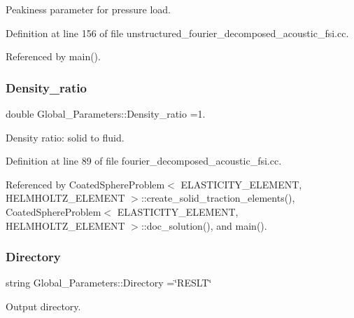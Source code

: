 Peakiness parameter for pressure load. 



Definition at line 156 of file unstructured\+\_\+fourier\+\_\+decomposed\+\_\+acoustic\+\_\+fsi.\+cc.



Referenced by main().

\mbox{\label{namespaceGlobal__Parameters_a517d4c31b8bce6563c2f605266dd9679}} 
\subsubsection{\texorpdfstring{Density\+\_\+ratio}{Density\_ratio}}
{\footnotesize\ttfamily double Global\+\_\+\+Parameters\+::\+Density\+\_\+ratio =1.}



Density ratio\+: solid to fluid. 



Definition at line 89 of file fourier\+\_\+decomposed\+\_\+acoustic\+\_\+fsi.\+cc.



Referenced by Coated\+Sphere\+Problem$<$ E\+L\+A\+S\+T\+I\+C\+I\+T\+Y\+\_\+\+E\+L\+E\+M\+E\+N\+T, H\+E\+L\+M\+H\+O\+L\+T\+Z\+\_\+\+E\+L\+E\+M\+E\+N\+T $>$\+::create\+\_\+solid\+\_\+traction\+\_\+elements(), Coated\+Sphere\+Problem$<$ E\+L\+A\+S\+T\+I\+C\+I\+T\+Y\+\_\+\+E\+L\+E\+M\+E\+N\+T, H\+E\+L\+M\+H\+O\+L\+T\+Z\+\_\+\+E\+L\+E\+M\+E\+N\+T $>$\+::doc\+\_\+solution(), and main().

\mbox{\label{namespaceGlobal__Parameters_a301ab922df72030c660b21328d6caf76}} 
\subsubsection{\texorpdfstring{Directory}{Directory}}
{\footnotesize\ttfamily string Global\+\_\+\+Parameters\+::\+Directory =\char`\"{}R\+E\+S\+LT\char`\"{}}



Output directory. 



